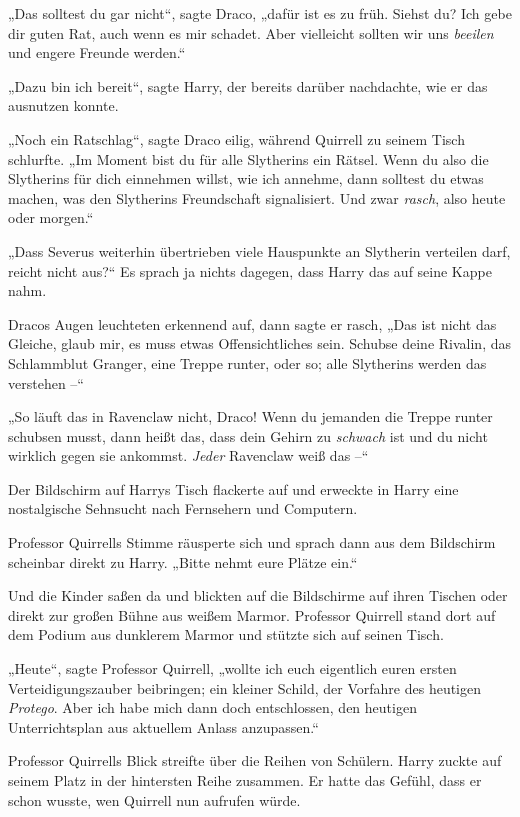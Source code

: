 {„Das solltest du gar nicht“, sagte Draco, „dafür ist es zu früh. Siehst du? Ich gebe dir guten Rat, auch wenn es mir schadet. Aber vielleicht sollten wir uns \emph{beeilen} und engere Freunde werden.“

„Dazu bin ich bereit“, sagte Harry, der bereits darüber nachdachte, wie er das ausnutzen konnte.

„Noch ein Ratschlag“, sagte Draco eilig, während Quirrell zu seinem Tisch schlurfte. „Im Moment bist du für alle Slytherins ein Rätsel. Wenn du also die Slytherins für dich einnehmen willst, wie ich annehme, dann solltest du etwas machen, was den Slytherins Freundschaft signalisiert. Und zwar \emph{rasch}, also heute oder morgen.“

„Dass Severus weiterhin übertrieben viele Hauspunkte an Slytherin verteilen darf, reicht nicht aus?“ Es sprach ja nichts dagegen, dass Harry das auf seine Kappe nahm.

Dracos Augen leuchteten erkennend auf, dann sagte er rasch, „Das ist nicht das Gleiche, glaub mir, es muss etwas Offensichtliches sein. Schubse deine Rivalin, das Schlammblut Granger, eine Treppe runter, oder so; alle Slytherins werden das verstehen --“

„So läuft das in Ravenclaw nicht, Draco! Wenn du jemanden die Treppe runter schubsen musst, dann heißt das, dass dein Gehirn zu \emph{schwach} ist und du nicht wirklich gegen sie ankommst. \emph{Jeder} Ravenclaw weiß das --“

Der Bildschirm auf Harrys Tisch flackerte auf und erweckte in Harry eine nostalgische Sehnsucht nach Fernsehern und Computern.

Professor Quirrells Stimme räusperte sich und sprach dann aus dem Bildschirm scheinbar direkt zu Harry. „Bitte nehmt eure Plätze ein.“

\later

Und die Kinder saßen da und blickten auf die Bildschirme auf ihren Tischen oder direkt zur großen Bühne aus weißem Marmor. Professor Quirrell stand dort auf dem Podium aus dunklerem Marmor und stützte sich auf seinen Tisch.

„Heute“, sagte Professor Quirrell, „wollte ich euch eigentlich euren ersten Verteidigungszauber beibringen; ein kleiner Schild, der Vorfahre des heutigen \emph{Protego}. Aber ich habe mich dann doch entschlossen, den heutigen Unterrichtsplan aus aktuellem Anlass anzupassen.“

Professor Quirrells Blick streifte über die Reihen von Schülern. Harry zuckte auf seinem Platz in der hintersten Reihe zusammen. Er hatte das Gefühl, dass er schon wusste, wen Quirrell nun aufrufen würde.

}
